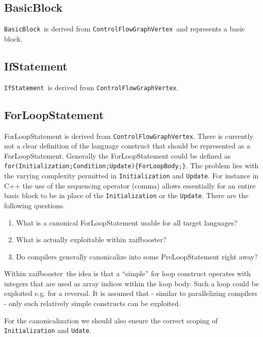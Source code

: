 \documentclass{book}
\newcommand{\xaifbooster}{xaifbooster}
\newcommand{\BasicBlock}{{\tt BasicBlock}}
\newcommand{\ControlFlowGraphVertex}{{\tt ControlFlowGraphVertex}}
\newcommand{\IfStatement}{{\tt IfStatement}}
\begin{document}
\subsection{BasicBlock}
\label{ssec:BasicBlock}

\BasicBlock\ is derived from \ControlFlowGraphVertex\ and represents a
basic block.

\subsection{IfStatement}
\label{ssec:IfStatement}

\IfStatement\ is derived from \ControlFlowGraphVertex.

\subsection{ForLoopStatement}
\label{ssec:ForLoopStatement}

ForLoopStatement is derived from \ControlFlowGraphVertex.
There is currently not a clear definition of 
the language construct that should be represented 
as a ForLoopStatement. Generally the ForLoopStatement 
could be defined as {\tt for(Initialization;Condition;Update)\{ForLoopBody;\}}.
The problem lies with the varying complexity permitted in 
{\tt Initialization} and {\tt Update}. For instance in 
C++ the use of the sequencing operator (comma) allows essentially 
for an entire basic block to be in place of the {\tt Initialization} 
or the {\tt Update}. 
There are the following questions. 
\begin{enumerate}
\item What is a canonical ForLoopStatement usable for all target languages?
\item What is actually exploitable within \xaifbooster?
\item Do compilers generally canonicalize into some PreLoopStatement 
right away?
\end{enumerate}
Within \xaifbooster\ the idea is that a ``simple'' for loop 
construct operates with integers that are used as array indices within
the loop body. Such a loop could be exploited e.g. for a reversal. 
It is assumed that - similar to parallelizing compilers - only such 
relatively simple constructs can be exploited. 

For the canonicalization we should also ensure the correct scoping of 
{\tt Initialization} and {\tt Udate}.
\end{document}
